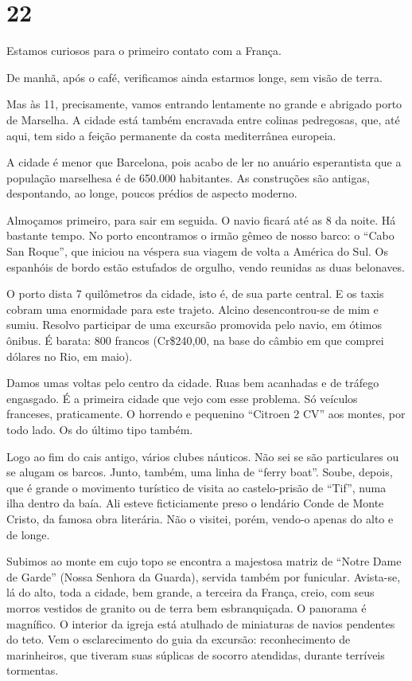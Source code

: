 \section*{22 \adfflatleafright {}}

Estamos curiosos para o primeiro contato com a França.

De manhã, após o café, verificamos ainda estarmos longe, sem visão de terra.

Mas às 11, precisamente, vamos entrando lentamente no grande e abrigado porto de Marselha. A cidade está também encravada entre colinas pedregosas, que, até aqui, tem sido a feição permanente da costa mediterrânea europeia.

A cidade é menor que Barcelona, pois acabo de ler no anuário esperantista que a população marselhesa é de 650.000 habitantes. As construções são antigas, despontando, ao longe, poucos prédios de aspecto moderno.

Almoçamos primeiro, para sair em seguida. O navio ficará até as 8 da noite. Há bastante tempo. No porto encontramos o irmão gêmeo de nosso barco: o ``Cabo San Roque'', que iniciou na véspera sua viagem de volta a América do Sul. Os espanhóis de bordo estão estufados de orgulho, vendo reunidas as duas belonaves.

O porto dista 7 quilômetros da cidade, isto é, de sua parte central. E os taxis cobram uma enormidade para este trajeto. Alcino desencontrou-se de mim e sumiu. Resolvo participar de uma excursão promovida pelo navio, em ótimos ônibus. É barata: 800 francos (Cr\$240,00, na base do câmbio em que comprei dólares no Rio, em maio).

Damos umas voltas pelo centro da cidade. Ruas bem acanhadas e de tráfego engasgado. É a primeira cidade que vejo com esse problema. Só veículos franceses, praticamente. O horrendo e pequenino ``Citroen 2 CV'' aos montes, por todo lado. Os do último tipo também.

Logo ao fim do cais antigo, vários clubes náuticos. Não sei se são particulares ou se alugam os barcos. Junto, também, uma linha de ``ferry boat''. Soube, depois, que é grande o movimento turístico de visita ao castelo-prisão de ``Tif'', numa ilha dentro da baía. Ali esteve ficticiamente preso o lendário Conde de Monte Cristo, da famosa obra literária. Não o visitei, porém, vendo-o apenas do alto e de longe.

Subimos ao monte em cujo topo se encontra a majestosa matriz de ``Notre Dame de Garde'' (Nossa Senhora da Guarda), servida também por funicular. Avista-se, lá do alto, toda a cidade, bem grande, a terceira da França, creio, com seus morros vestidos de granito ou de terra bem esbranquiçada. O panorama é magnífico. O interior da igreja está atulhado de miniaturas de navios pendentes do teto. Vem o esclarecimento do guia da excursão: reconhecimento de marinheiros, que tiveram suas súplicas de socorro atendidas, durante terríveis tormentas.

